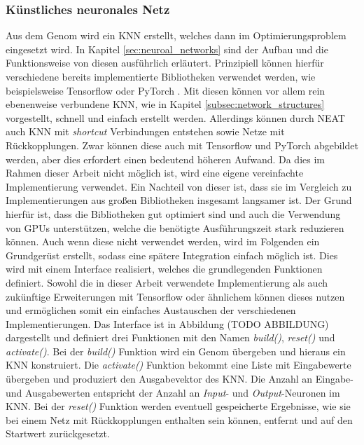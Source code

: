 \subsubsection{Künstliches neuronales Netz}
Aus dem Genom wird ein \ac{KNN} erstellt, welches dann im Optimierungsproblem eingesetzt wird. In Kapitel \ref{sec:neuroal_networks} sind der Aufbau und die Funktionsweise von diesen ausführlich erläutert. Prinzipiell können hierfür verschiedene bereits implementierte Bibliotheken verwendet werden, wie beispielsweise Tensorflow \cite{tensorflow2015} oder PyTorch \cite{pytorch2019}. Mit diesen können vor allem rein ebenenweise verbundene \ac{KNN}, wie in Kapitel \ref{subsec:network_structures} vorgestellt, schnell und einfach erstellt werden. Allerdings können durch \ac{NEAT} auch \ac{KNN} mit \emph{shortcut} Verbindungen entstehen sowie Netze mit Rückkopplungen. Zwar können diese  auch mit Tensorflow und PyTorch abgebildet werden, aber dies erfordert einen bedeutend höheren Aufwand. Da dies im Rahmen dieser Arbeit nicht möglich ist, wird eine eigene vereinfachte Implementierung verwendet. Ein Nachteil von dieser ist, dass sie im Vergleich zu Implementierungen aus großen Bibliotheken insgesamt langsamer ist. Der Grund hierfür ist, dass die Bibliotheken gut optimiert sind und auch die Verwendung von \acp{GPU} unterstützen, welche die benötigte Ausführungszeit stark reduzieren können. Auch wenn diese nicht verwendet werden, wird im Folgenden ein Grundgerüst erstellt, sodass eine spätere Integration einfach möglich ist. Dies wird mit einem Interface realisiert, welches die grundlegenden Funktionen definiert. Sowohl die in dieser Arbeit verwendete Implementierung als auch zukünftige Erweiterungen mit Tensorflow oder ähnlichem können dieses nutzen und ermöglichen somit ein einfaches Austauschen der verschiedenen Implementierungen. Das Interface ist in Abbildung (TODO ABBILDUNG) dargestellt und definiert drei Funktionen mit den Namen \emph{build()}, \emph{reset()} und \emph{activate()}. Bei der \emph{build()} Funktion wird ein Genom übergeben und hieraus ein \ac{KNN} konstruiert. Die \emph{activate()} Funktion bekommt eine Liste mit Eingabewerte übergeben und produziert den Ausgabevektor des \ac{KNN}. Die Anzahl an Eingabe- und Ausgabewerten entspricht der Anzahl an \emph{Input}- und \emph{Output}-Neuronen im \ac{KNN}. Bei der \emph{reset()} Funktion werden eventuell gespeicherte Ergebnisse, wie sie bei einem Netz mit Rückkopplungen enthalten sein können, entfernt und auf den Startwert zurückgesetzt. 
\\\\

